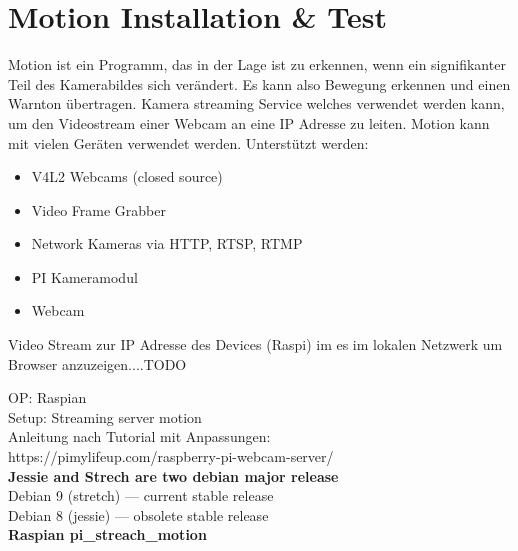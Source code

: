 \section{Motion Installation \& Test}

Motion ist ein Programm, das in der Lage ist zu erkennen, wenn ein signifikanter Teil des Kamerabildes sich verändert. Es kann also 
Bewegung erkennen und einen Warnton übertragen. Kamera streaming 
Service welches verwendet werden kann, um den Videostream 
einer Webcam an eine IP Adresse zu leiten. Motion kann mit 
vielen Geräten verwendet werden. Unterstützt werden:
\begin{itemize}
\item V4L2 Webcams (closed source)
\item Video Frame Grabber
\item Network Kameras via HTTP, RTSP, RTMP
\item PI Kameramodul
\item Webcam
\end{itemize}

Video Stream zur IP Adresse des Devices (Raspi) im es im lokalen 
Netzwerk um Browser anzuzeigen....TODO

OP: Raspian\\
Setup: Streaming server motion\\

Anleitung nach Tutorial mit Anpassungen:\\
https://pimylifeup.com/raspberry-pi-webcam-server/\\

\textbf{Jessie and Strech are two debian major release}\\
Debian 9 (stretch) — current stable release\\
Debian 8 (jessie) — obsolete stable release\\

\textbf{Raspian pi\_streach\_motion}

